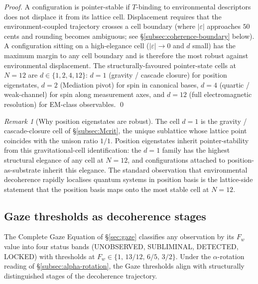 \documentclass[11pt,a4paper]{article}
\theoremstyle{definition}
\theoremstyle{remark}
\newtheorem{remark}[theorem]{Remark}
\begin{document}
\begin{proof}
A configuration is pointer-stable if $T$-binding to environmental descriptors does not displace it from its lattice cell. Displacement requires that the environment-coupled trajectory crosses a cell boundary (where $|\varepsilon|$ approaches $50$ cents and rounding becomes ambiguous; see \S\ref{subsec:coherence-boundary} below). A configuration sitting on a high-elegance cell ($|\varepsilon| \to 0$ and $d$ small) has the maximum margin to any cell boundary and is therefore the most robust against environmental displacement. The structurally-favoured pointer-state cells at $N = 12$ are $d \in \{1, 2, 4, 12\}$: $d=1$ (gravity / cascade closure) for position eigenstates, $d=2$ (Mediation pivot) for spin in canonical bases, $d=4$ (quartic / weak-channel) for spin along measurement axes, and $d=12$ (full electromagnetic resolution) for EM-class observables. \qed
\end{proof}

\begin{remark}[Why position eigenstates are robust]\label{rem:position-pointer}
The cell $d=1$ is the gravity / cascade-closure cell of \S\ref{subsec:Mcrit}, the unique sublattice whose lattice point coincides with the unison ratio $1/1$. Position eigenstates inherit pointer-stability from this gravitational-cell identification: the $d=1$ family has the highest structural elegance of any cell at $N=12$, and configurations attached to position-as-substrate inherit this elegance. The standard observation that environmental decoherence rapidly localises quantum systems in position basis is the lattice-side statement that the position basis maps onto the most stable cell at $N = 12$.
\end{remark}

\subsection{Gaze thresholds as decoherence stages}\label{subsec:gaze-decoherence-stages}

The Complete Gaze Equation of \S\ref{sec:gaze} classifies any observation by its $F_{w}$ value into four status bands (UNOBSERVED, SUBLIMINAL, DETECTED, LOCKED) with thresholds at $F_{w} \in \{1,\,13/12,\,6/5,\,3/2\}$. Under the $\alpha$-rotation reading of \S\ref{subsec:alpha-rotation}, the Gaze thresholds align with structurally distinguished stages of the decoherence trajectory.
\end{document}

